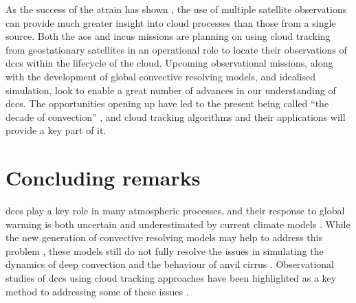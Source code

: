 As the success of the \acrshort{atrain} has shown \citep{stephens_cloudsat_2018}, the use of multiple satellite observations can provide much greater insight into cloud processes than those from a single source.
Both the \acrshort{aos} and \acrshort{incus} missions are planning on using cloud tracking from geostationary satellites in an operational role to locate their observations of \acrshort{dcc}s within the lifecycle of the cloud.
Upcoming observational missions, along with the development of global convective resolving models, and idealised simulation, look to enable a great number of advances in our understanding of \acrshort{dcc}s.
The opportunities opening up have led to the present being called ``the decade of convection'' \citep{vandenheever_tropical_2023}, and cloud tracking algorithms and their applications will provide a key part of it.

\section{Concluding remarks}


\acrshort{dcc}s play a key role in many atmospheric processes, and their response to global warming is both uncertain \citep{sherwood_assessment_2020} and underestimated by current climate models \citep{hill_climate_2023}.
While the new generation of convective resolving models may help to address this problem \citep{stevens_added_2020}, these models still do not fully resolve the issues in simulating the dynamics of deep convection \citep{jeevanjee_vertical_2017} and the behaviour of anvil cirrus \citep{sullivan_ice_2021}.
Observational studies of \acrshort{dcc}s using cloud tracking approaches have been highlighted as a key method to addressing some of these issues \citep{gasparini_opinion_2023}.

